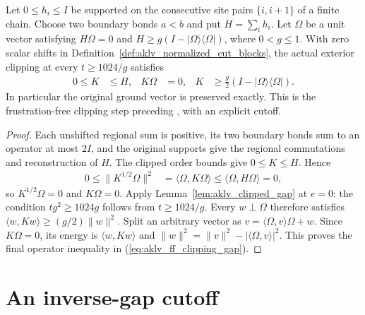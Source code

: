 \begin{lemma}
    \label{lem:aklv_frustration_free_clipping}
    \leanok
    Let $0\le h_i\le I$ be supported on the consecutive site pairs
    $\{i,i+1\}$ of a finite chain. Choose two boundary bonds $a<b$ and put
    $H=\sum_i h_i$. Let $\Omega$ be a unit vector satisfying $H\Omega=0$
    and $H\ge g(I-|\Omega\rangle\langle\Omega|)$, where $0<g\le1$.
    With zero scalar shifts in Definition~\ref{def:aklv_normalized_cut_blocks},
    the actual exterior clipping at every $t\ge1024/g$ satisfies
    \begin{align}
        0\le K & \le H,                                       & K\Omega & =0, &
        K      & \ge\frac g2(I-|\Omega\rangle\langle\Omega|).
        \label{eq:aklv_ff_clipping_gap}
    \end{align}
    In particular the original ground vector is preserved exactly.
    This is the frustration-free clipping step preceding
    \cite[Theorem~4.3]{Arad2013AreaLaw}, with an explicit cutoff.
\end{lemma}
\begin{proof}
    \leanok
    Each unshifted regional sum is positive, its two boundary bonds sum
    to an operator at most $2I$, and the original supports give the
    regional commutations and reconstruction of $H$.
    The clipped order bounds give $0\le K\le H$. Hence
    \begin{align}
        0\le\|K^{1/2}\Omega\|^2
         & =\langle\Omega,K\Omega\rangle
        \le\langle\Omega,H\Omega\rangle=0,
        \label{eq:aklv_ff_clipping_kernel_sandwich}
    \end{align}
    so $K^{1/2}\Omega=0$ and $K\Omega=0$.
    Apply Lemma~\ref{lem:aklv_clipped_gap} at $e=0$:
    the condition $tg^2\ge1024g$ follows from $t\ge1024/g$.
    Every $w\perp\Omega$ therefore satisfies
    $\langle w,Kw\rangle\ge(g/2)\|w\|^2$.
    Split an arbitrary vector as
    $v=\langle\Omega,v\rangle\Omega+w$.
    Since $K\Omega=0$, its energy is $\langle w,Kw\rangle$ and
    $\|w\|^2=\|v\|^2-|\langle\Omega,v\rangle|^2$.
    This proves the final operator inequality in
    (\ref{eq:aklv_ff_clipping_gap}).
\end{proof}

\section{An inverse-gap cutoff}

